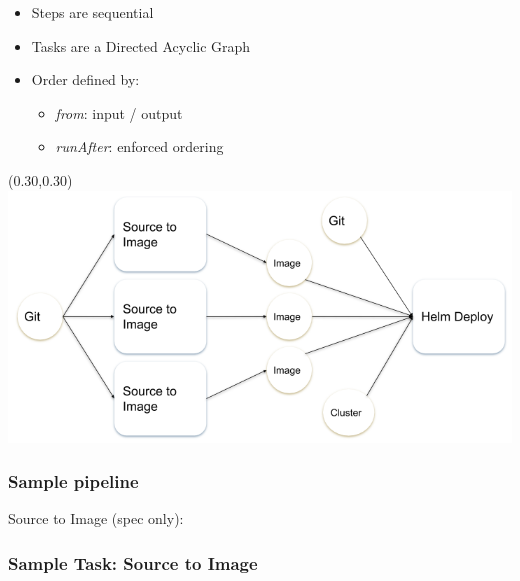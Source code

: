 \documentclass[aspectratio=169,11pt,hyperref={colorlinks=true}]{beamer}
\begin{document}
\begin{lblackrwhiteframe}
\begin{lblackrwhiteframe}
\begin{blackframe}
\begin{2columnsframe}
  {
    \begin{itemize}
      \item Steps are sequential
      \item Tasks are a Directed Acyclic Graph
      \item Order defined by:
      \begin{itemize}
        \item {\em from}: input / output
        \item {\em runAfter}: enforced ordering
      \end{itemize}
    \end{itemize}
  }
  {
  \begin{textblock*}{0.65\paperwidth}(0.30\paperwidth,0.30\paperheight)
    \centering
    \includegraphics[width=0.65\paperwidth]{img/pipeline.png}
  \end{textblock*}
  }
  \frametitle{Sample pipeline}
\end{2columnsframe}

\begin{2columnsframe}
  {
  {\tiny Source to Image (spec only): \\}
  
  }
  {
  
  }
  \frametitle{Sample Task: Source to Image}
\end{2columnsframe}


\end{blackframe}
\end{lblackrwhiteframe}
\end{lblackrwhiteframe}
\end{document}
